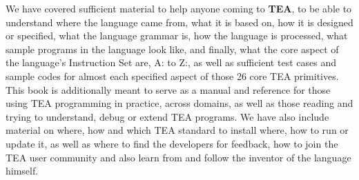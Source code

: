\documentclass[a4paper, 18pt]{book} %
\begin{document}
We have covered sufficient material to help anyone coming to \textbf{TEA}, to be able to understand where the language came from, what it is based on, how it is designed or specified, what the language grammar is, how the language is processed, what sample programs in the language look like, and finally, what the core aspect of the language's Instruction Set are, A: to Z:, as well as sufficient test cases and sample codes for almost each specified aspect of those 26 core TEA primitives. This book is additionally meant to serve as a manual and reference for those using TEA programming in practice, across domains, as well as those reading and trying to understand, debug or extend TEA programs. We have also include material on where, how and which TEA standard to install where, how to run or update it, as well as where to find the developers for feedback, how to join the TEA user community and also learn from and follow the inventor of the language himself.




\begin{appendices}





\end{appendices}

%






\vspace{5cm}
\\
\end{document}
